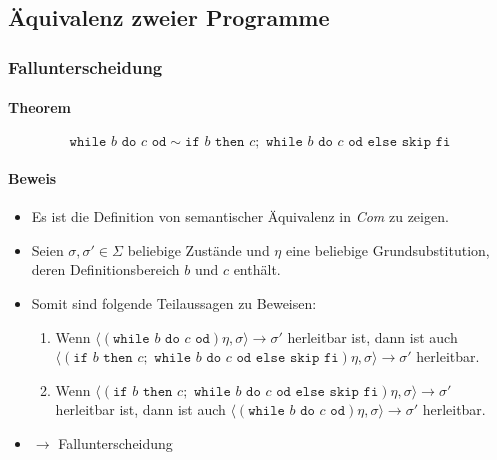 		\subsection{Äquivalenz zweier Programme}
			\subsubsection{Fallunterscheidung}
				\paragraph{Theorem}
					\begin{equation*}
						\texttt{while } b \texttt{ do } c \texttt{ od} \sim \texttt{if } b \texttt{ then } c ; \texttt{ while } b \texttt{ do } c \texttt{ od else skip fi}
					\end{equation*}

				\paragraph{Beweis}
					\begin{itemize}
						\item Es ist die Definition von semantischer Äquivalenz in \textit{Com} zu zeigen.
						\item Seien $ \sigma, \sigma' \in \Sigma $ beliebige Zustände und $ \eta $ eine beliebige Grundsubstitution, deren Definitionsbereich $ b $ und $ c $ enthält.
						\item Somit sind folgende Teilaussagen zu Beweisen:
							\begin{enumerate}
								\item Wenn $ \langle (\texttt{while } b \texttt{ do } c \texttt{ od}) \eta, \sigma \rangle \rightarrow \sigma' $ herleitbar ist, dann ist auch \\ $ \langle (\texttt{if } b \texttt{ then } c ; \texttt{ while } b \texttt{ do } c \texttt{ od else skip fi}) \eta, \sigma \rangle \rightarrow \sigma' $ herleitbar.
								\item Wenn $ \langle (\texttt{if } b \texttt{ then } c ; \texttt{ while } b \texttt{ do } c \texttt{ od else skip fi}) \eta, \sigma \rangle \rightarrow \sigma' $ herleitbar ist, dann ist auch $ \langle (\texttt{while } b \texttt{ do } c \texttt{ od}) \eta, \sigma \rangle \rightarrow \sigma' $ herleitbar.
							\end{enumerate}
						\item $ \rightarrow $ Fallunterscheidung
					\end{itemize}

